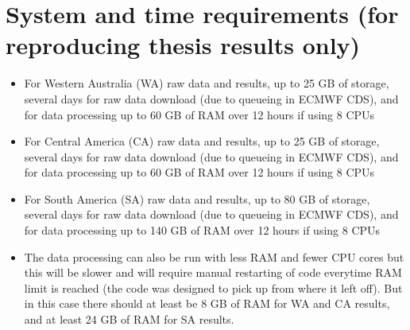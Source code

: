\section{System and time requirements (for reproducing thesis results only)}
\begin{itemize}
	\item For Western Australia (WA) raw data and results, up to 25 GB of storage, several days for raw data download (due to queueing in ECMWF CDS), and for data processing up to 60 GB of RAM over 12 hours if using 8 CPUs
	\item For Central America (CA) raw data and results, up to 25 GB of storage, several days for raw data download (due to queueing in ECMWF CDS), and for data processing up to 60 GB of RAM over 12 hours if using 8 CPUs
	\item For South America (SA) raw data and results, up to 80 GB of storage, several days for raw data download (due to queueing in ECMWF CDS), and for data processing up to 140 GB of RAM over 12 hours if using 8 CPUs
	\item The data processing can also be run with less RAM and fewer CPU cores but this will be slower and will require manual restarting of code everytime RAM limit is reached (the code was designed to pick up from where it left off). But in this case there should at least be 8 GB of RAM for WA and CA results, and at least 24 GB of RAM for SA results.
\end{itemize}
